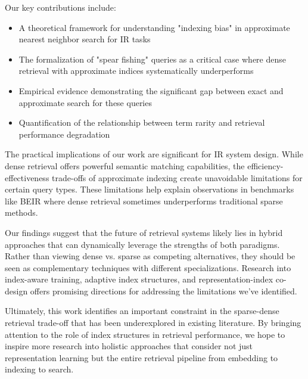 \documentclass[manuscript]{acmart}
\begin{document}
Our key contributions include:

\begin{itemize}
\item A theoretical framework for understanding "indexing bias" in approximate nearest neighbor search for IR tasks
\item The formalization of "spear fishing" queries as a critical case where dense retrieval with approximate indices systematically underperforms
\item Empirical evidence demonstrating the significant gap between exact and approximate search for these queries
\item Quantification of the relationship between term rarity and retrieval performance degradation
\end{itemize}

The practical implications of our work are significant for IR system design. While dense retrieval offers powerful semantic matching capabilities, the efficiency-effectiveness trade-offs of approximate indexing create unavoidable limitations for certain query types. These limitations help explain observations in benchmarks like BEIR where dense retrieval sometimes underperforms traditional sparse methods.

Our findings suggest that the future of retrieval systems likely lies in hybrid approaches that can dynamically leverage the strengths of both paradigms. Rather than viewing dense vs. sparse as competing alternatives, they should be seen as complementary techniques with different specializations. Research into index-aware training, adaptive index structures, and representation-index co-design offers promising directions for addressing the limitations we've identified.

Ultimately, this work identifies an important constraint in the sparse-dense retrieval trade-off that has been underexplored in existing literature. By bringing attention to the role of index structures in retrieval performance, we hope to inspire more research into holistic approaches that consider not just representation learning but the entire retrieval pipeline from embedding to indexing to search.



\end{document}
